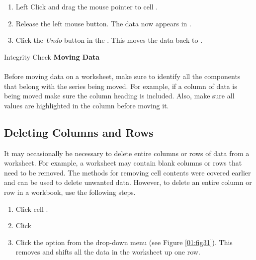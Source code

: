 \begin{enumerate}[resume]
	\item Left Click and drag the mouse pointer to cell .
	\item Release the left mouse button. The data now appears in .
	\item Click the \textit{Undo} button in the . This moves the data back to .
\end{enumerate}

\begin{center}
	\begin{infobox}{Integrity Check}
		\textbf{Moving Data}
		\\
		\\
		Before moving data on a worksheet, make sure to identify all the components that belong with the series being moved. For example, if a column of data is being moved make sure the column heading is included. Also, make sure all values are highlighted in the column before moving it.
	\end{infobox}
\end{center}


\subsection{Deleting Columns and Rows}

It may occasionally be necessary to delete entire columns or rows of data from a worksheet. For example, a worksheet may contain blank columns or rows that need to be removed. The methods for removing cell contents were covered earlier and can be used to delete unwanted data. However, to delete an entire column or row in a workbook, use the following steps.

\begin{enumerate}
	\item Click cell .
	\item Click 
	\item Click the  option from the drop-down menu (see Figure \ref{01:fig31}). This removes  and shifts all the data in the worksheet up one row.
\end{enumerate}

